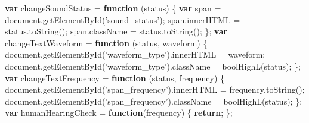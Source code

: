 \documentclass[]{article}
\newenvironment{Shaded}{}{}
\newcommand{\KeywordTok}[1]{\textbf{#1}}
\newcommand{\StringTok}[1]{#1}
\newcommand{\VariableTok}[1]{#1}
\newcommand{\ControlFlowTok}[1]{\textbf{#1}}
\newcommand{\OperatorTok}[1]{#1}
\newcommand{\AttributeTok}[1]{#1}
\newcommand{\NormalTok}[1]{#1}
\begin{document}
\begin{Shaded}
\begin{Highlighting}[]
\KeywordTok{var}\NormalTok{ changeSoundStatus }\OperatorTok{=} \KeywordTok{function}\NormalTok{ (status) }\OperatorTok{\{}
    \KeywordTok{var}\NormalTok{ span }\OperatorTok{=} \VariableTok{document}\NormalTok{.}\AttributeTok{getElementById}\NormalTok{(}\StringTok{'sound_status'}\NormalTok{)}\OperatorTok{;}
    \VariableTok{span}\NormalTok{.}\AttributeTok{innerHTML} \OperatorTok{=} \VariableTok{status}\NormalTok{.}\AttributeTok{toString}\NormalTok{()}\OperatorTok{;}
    \VariableTok{span}\NormalTok{.}\AttributeTok{className} \OperatorTok{=} \VariableTok{status}\NormalTok{.}\AttributeTok{toString}\NormalTok{()}\OperatorTok{;}
\OperatorTok{\};}
\KeywordTok{var}\NormalTok{ changeTextWaveform }\OperatorTok{=} \KeywordTok{function}\NormalTok{ (status}\OperatorTok{,}\NormalTok{ waveform) }\OperatorTok{\{}
    \VariableTok{document}\NormalTok{.}\AttributeTok{getElementById}\NormalTok{(}\StringTok{'waveform_type'}\NormalTok{).}\AttributeTok{innerHTML} \OperatorTok{=}\NormalTok{ waveform}\OperatorTok{;}
    \VariableTok{document}\NormalTok{.}\AttributeTok{getElementById}\NormalTok{(}\StringTok{'waveform_type'}\NormalTok{).}\AttributeTok{className} \OperatorTok{=} \AttributeTok{boolHighL}\NormalTok{(status)}\OperatorTok{;}
\OperatorTok{\};}
\KeywordTok{var}\NormalTok{ changeTextFrequency }\OperatorTok{=} \KeywordTok{function}\NormalTok{ (status}\OperatorTok{,}\NormalTok{ frequency) }\OperatorTok{\{}
    \VariableTok{document}\NormalTok{.}\AttributeTok{getElementById}\NormalTok{(}\StringTok{'span_frequency'}\NormalTok{).}\AttributeTok{innerHTML} \OperatorTok{=} \VariableTok{frequency}\NormalTok{.}\AttributeTok{toString}\NormalTok{()}\OperatorTok{;}
    \VariableTok{document}\NormalTok{.}\AttributeTok{getElementById}\NormalTok{(}\StringTok{'span_frequency'}\NormalTok{).}\AttributeTok{className} \OperatorTok{=} \AttributeTok{boolHighL}\NormalTok{(status)}\OperatorTok{;} 
\OperatorTok{\};}
\KeywordTok{var}\NormalTok{ humanHearingCheck }\OperatorTok{=} \KeywordTok{function}\NormalTok{(frequency) }\OperatorTok{\{}
    \ControlFlowTok{return}\OperatorTok{;}
\OperatorTok{\};}
\end{Highlighting}
\end{Shaded}
\end{document}
